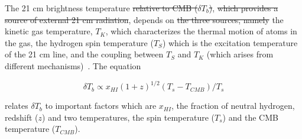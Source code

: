 	
	\attention{***} The 21 cm brightness temperature\attention{,} \st{relative to CMB (}$\delta$$T_b$\st{)}, \st{which provides a source of external 21 cm radiation}, depends on \st{the three sources, namely} the kinetic gas temperature, $T_K$, which characterizes the thermal motion of atoms in the gas, the hydrogen spin temperature ($T_S$) which is the excitation temperature of the 21 cm line, and the coupling between $T_S$ and $T_K$ (which arises from different mechanisms)~\citep{2015aska.confE...1K,2006PhR...433..181F}.  The equation  
	
	\begin{equation}
	\delta{T_b}\propto {x_{HI}}(1+z)^{1/2}({T_s}-{T_{CMB}})/{T_s}
	\end{equation}
	
	 relates $\delta$$T_b$ to important factors which are \(x_{HI}\), the fraction of neutral hydrogen, redshift ($z$) and two temperatures, the spin temperature ($T_s$) and the CMB temperature ($T_{CMB}$).
	
	 \\
	

